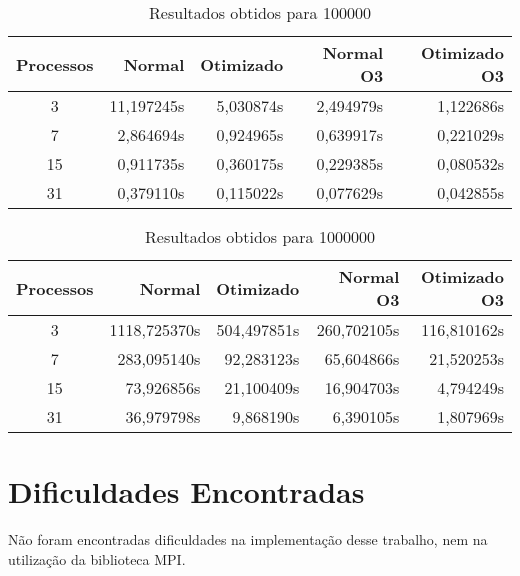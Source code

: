 \documentclass[11pt]{IEEEtran}
\begin{document}
	\begin{table}[H]
		\centering
			\begin{tabular}{c|r|r|r|r}
				Processos & Normal & Otimizado & Normal O3 & Otimizado O3 \\
				\hline
				3  & 11,197245s & 5,030874s & 2,494979s & 1,122686s \\
				\hline
				7  &  2,864694s & 0,924965s & 0,639917s & 0,221029s \\
				\hline
				15 &  0,911735s & 0,360175s & 0,229385s & 0,080532s \\
				\hline
				31 &  0,379110s & 0,115022s & 0,077629s & 0,042855s \\
			\end{tabular}
		\caption{Resultados obtidos para 100000}
		\label{result_table}
	\end{table}

	\begin{table}[H]
		\centering
			\begin{tabular}{c|r|r|r|r}
				Processos & Normal & Otimizado & Normal O3 & Otimizado O3 \\
				\hline
				3  & 1118,725370s & 504,497851s & 260,702105s & 116,810162s \\
				\hline
				7  &  283,095140s &  92,283123s &  65,604866s & 21,520253s \\
				\hline
				15 &   73,926856s &  21,100409s &  16,904703s & 4,794249s \\
				\hline
				31 &   36,979798s &   9,868190s &   6,390105s & 1,807969s \\
			\end{tabular}
		\caption{Resultados obtidos para 1000000}
		\label{result_table}
	\end{table}


\section{Dificuldades Encontradas}

	Não foram encontradas dificuldades na implementação desse trabalho, nem na
	utilização da biblioteca MPI\@.
\end{document}
